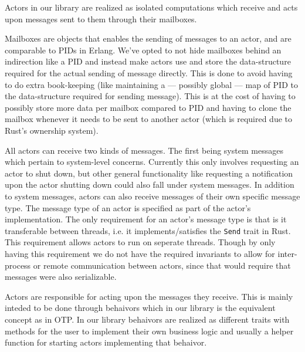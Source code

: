 \documentclass[a4paper]{article}
\begin{document}
Actors in our library are realized as isolated computations %
which receive and acts upon messages sent to them through their mailboxes.

Mailboxes are objects that enables the sending of messages to an actor, and are
comparable to PIDs in Erlang. We've opted to not hide mailboxes behind an
indirection like a PID and instead make actors use and store the data-structure
required for the actual sending of message directly. This is done to avoid
having to do extra book-keeping (like maintaining a --- possibly global --- map
of PID to the data-structure required for sending message). This is at the cost
of having to possibly store more data per mailbox compared to PID and having to
clone the mailbox whenever it needs to be sent to another actor (which is
required due to Rust's ownership system).

All actors can receive two kinds of messages. The first being system messages
which pertain to system-level concerns.
Currently this only involves requesting an actor to shut down, but other general
functionality like requesting a notification upon the actor shutting down could
also fall under system messages. In addition to system messages, actors can also
receive messages of their own specific message type. The message type of an
actor is specified as part of the actor's implementation. The only requirement for an
actor's message type is that is it transferable between threads, i.e. it
implements/satisfies the \texttt{Send} trait in Rust. This requirement allows
actors to run on seperate threads. Though by only having this requirement we do
not have the required invariants to allow for inter-process or remote
communication between actors, since that would require that messages were also
serializable.

Actors are responsible for acting upon the messages they receive. This is mainly
inteded to be done through behaivors which in our library is the equivalent
concept as in OTP. In our library behaivors are realized as different traits
with methods for the user to implement their own business
logic and usually a helper function for starting actors implementing that behaivor.
\end{document}
